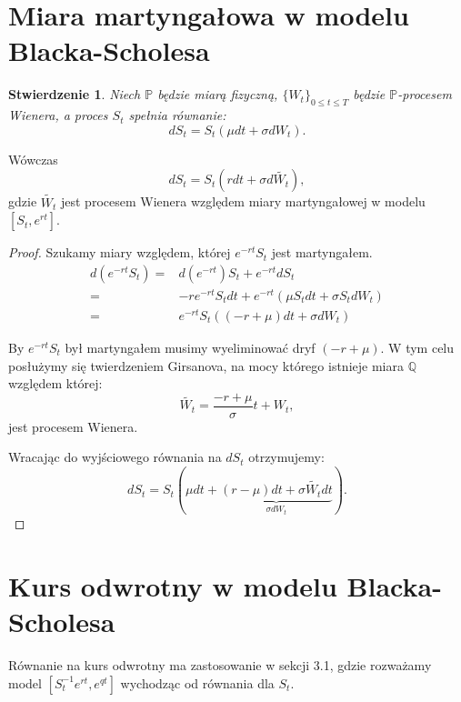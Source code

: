 \documentclass[11pt]{report}
\newtheorem{stw}{Stwierdzenie}[chapter]
\begin{document}
\section{Miara martyngałowa w modelu Blacka-Scholesa}


\begin{stw} Niech $\mathbb{P}$ będzie miarą fizyczną, $\{ W_t \}_{0 \le t \le T} $ będzie $\mathbb{P}$-procesem Wienera, a proces $S_t$ spełnia równanie:
\begin{equation}
dS_t = S_t(\mu dt + \sigma dW_t).
\end{equation}
\end{stw}


Wówczas 
\begin{equation*}
dS_t = S_t(r dt + \sigma d\widetilde{W_t}),
\end{equation*}
gdzie $\widetilde{W_t}$ jest procesem Wienera względem miary martyngałowej w modelu $[S_t, e^{rt}]$.  
\begin{proof}
Szukamy miary względem, której $e^{-rt}S_t$ jest martyngałem.
\begin{equation*}
\begin{split}
d(e^{-rt}S_t) = & d(e^{-rt})S_t  + e^{-rt} dS_t \\
              = & -re^{-rt}S_t dt + e^{-rt}(\mu S_t dt + \sigma S_t dW_t) \\
              = & e^{-rt}S_t( (-r + \mu)dt + \sigma dW_t)
\end{split}
\end{equation*}

By $e^{-rt}S_t$ był martyngałem musimy wyeliminować dryf $(-r+\mu)$. W tym celu posłużymy się twierdzeniem Girsanova, na mocy którego istnieje miara $\mathbb{Q}$ względem której:
\begin{equation*}
\widetilde{W_t} = \frac{-r + \mu}{\sigma}t + W_t,
\end{equation*}
jest procesem Wienera.

Wracając do wyjściowego równania na $dS_t$ otrzymujemy:
\begin{equation*}
dS_t = S_t(\mu dt + \underbrace{(r-\mu)dt + \sigma\widetilde{W_t}dt}_{\sigma dW_t} ).
\end{equation*}

\end{proof}


\section{Kurs odwrotny w modelu Blacka-Scholesa}
Równanie na kurs odwrotny ma zastosowanie w sekcji 3.1, gdzie rozważamy model $[S^{-1}_t e^{rt}, e^{qt}]$ wychodząc od równania dla $S_t$.
\end{document}
